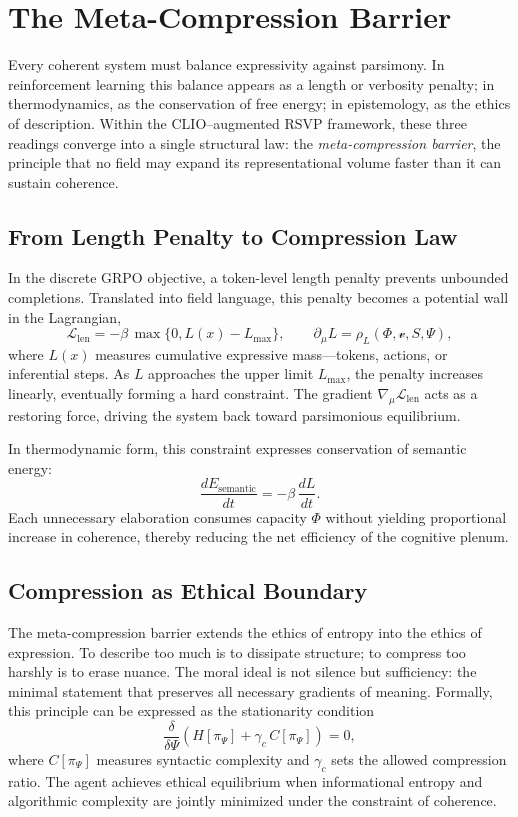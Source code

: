 \documentclass[11pt]{article}
\begin{document}
\section{The Meta-Compression Barrier}
Every coherent system must balance expressivity against parsimony.  
In reinforcement learning this balance appears as a length or verbosity penalty;  
in thermodynamics, as the conservation of free energy;  
in epistemology, as the ethics of description.  
Within the CLIO–augmented RSVP framework, these three readings converge into a single structural law:  
the \emph{meta-compression barrier}, the principle that no field may expand its representational volume faster than it can sustain coherence.

\subsection{From Length Penalty to Compression Law}

In the discrete GRPO objective, a token-level length penalty prevents unbounded completions.  
Translated into field language, this penalty becomes a potential wall in the Lagrangian,
\[
\mathcal{L}_{\mathrm{len}}
=
-\beta\,\max\{0,L(x)-L_{\max}\},
\qquad
\partial_\mu L = \rho_L(\Phi,\mathcal{v},S,\Psi),
\]
where $L(x)$ measures cumulative expressive mass—tokens, actions, or inferential steps.  
As $L$ approaches the upper limit $L_{\max}$, the penalty increases linearly, eventually forming a hard constraint.  
The gradient $\nabla_\mu \mathcal{L}_{\mathrm{len}}$ acts as a restoring force, driving the system back toward parsimonious equilibrium.

In thermodynamic form, this constraint expresses conservation of semantic energy:
\[
\frac{dE_{\mathrm{semantic}}}{dt}
= -\beta\,\frac{dL}{dt}.
\]
Each unnecessary elaboration consumes capacity $\Phi$ without yielding proportional increase in coherence, thereby reducing the net efficiency of the cognitive plenum.

\subsection{Compression as Ethical Boundary}

The meta-compression barrier extends the ethics of entropy into the ethics of expression.  
To describe too much is to dissipate structure;  
to compress too harshly is to erase nuance.  
The moral ideal is not silence but sufficiency: the minimal statement that preserves all necessary gradients of meaning.  
Formally, this principle can be expressed as the stationarity condition
\[
\frac{\delta}{\delta \Psi}\!\left(H[\pi_\Psi]+\gamma_c\,C[\pi_\Psi]\right)=0,
\]
where $C[\pi_\Psi]$ measures syntactic complexity and $\gamma_c$ sets the allowed compression ratio.  
The agent achieves ethical equilibrium when informational entropy and algorithmic complexity are jointly minimized under the constraint of coherence.
\end{document}

